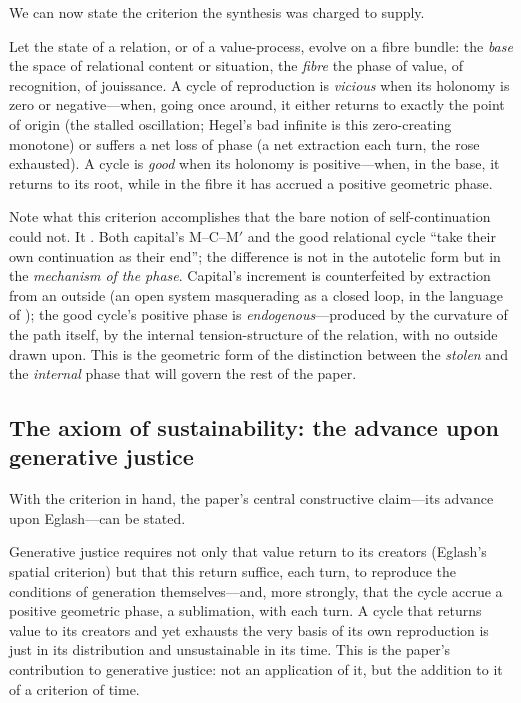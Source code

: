We can now state the criterion the synthesis was charged to supply.

\begin{claim}
Let the state of a relation, or of a value-process, evolve on a fibre bundle: the \emph{base} the space of relational content or situation, the \emph{fibre} the phase of value, of recognition, of jouissance. A cycle of reproduction is \emph{vicious} when its holonomy is zero or negative---when, going once around, it either returns to exactly the point of origin (the stalled oscillation; Hegel's bad infinite is this zero-creating monotone) or suffers a net loss of phase (a net extraction each turn, the rose exhausted). A cycle is \emph{good} when its holonomy is positive---when, in the base, it returns to its root, while in the fibre it has accrued a positive geometric phase. 
\end{claim}

Note what this criterion accomplishes that the bare notion of self-continuation could not. It . Both capital's M--C--M$'$ and the good relational cycle ``take their own continuation as their end''; the difference is not in the autotelic form but in the \emph{mechanism of the phase}. Capital's increment is counterfeited by extraction from an outside (an open system masquerading as a closed loop, in the language of ); the good cycle's positive phase is \emph{endogenous}---produced by the curvature of the path itself, by the internal tension-structure of the relation, with no outside drawn upon. This is the geometric form of the distinction between the \emph{stolen} and the \emph{internal} phase that will govern the rest of the paper.

\subsection{The axiom of sustainability: the advance upon generative justice}
\label{p09:sec:axiom}

With the criterion in hand, the paper's central constructive claim---its advance upon Eglash---can be stated.

\begin{claim}
Generative justice requires not only that value return to its creators (Eglash's spatial criterion) but that this return suffice, each turn, to reproduce the conditions of generation themselves---and, more strongly, that the cycle accrue a positive geometric phase, a sublimation, with each turn. A cycle that returns value to its creators and yet exhausts the very basis of its own reproduction is just in its distribution and unsustainable in its time.  This is the paper's contribution to generative justice: not an application of it, but the addition to it of a criterion of time.
\end{claim}

